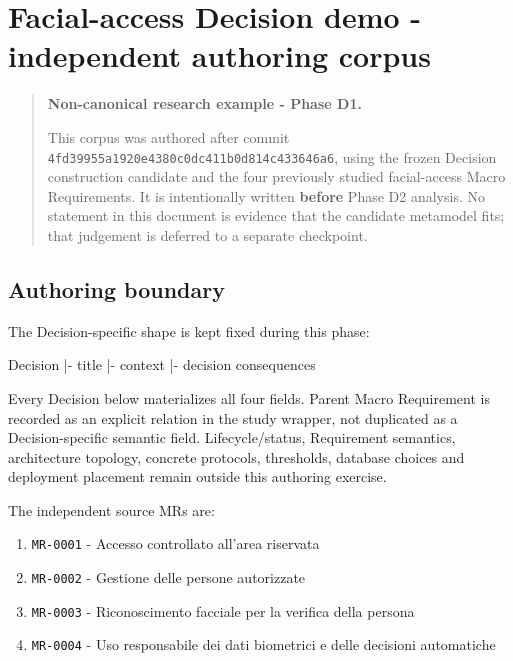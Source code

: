 \documentclass[
  10pt,
]{article}
\author{}
\date{}
\newenvironment{Shaded}{}{}
\newcommand{\NormalTok}[1]{#1}
\providecommand{\tightlist}{%
  \setlength{\itemsep}{0pt}\setlength{\parskip}{0pt}}
\begin{document}
\section{Facial-access Decision demo - independent authoring
corpus}\label{facial-access-decision-demo---independent-authoring-corpus}

\begin{quote}
\textbf{Non-canonical research example - Phase D1.}

This corpus was authored after commit
\texttt{4fd39955a1920e4380c0dc411b0d814c433646a6}, using the frozen
Decision construction candidate and the four previously studied
facial-access Macro Requirements. It is intentionally written
\textbf{before} Phase D2 analysis. No statement in this document is
evidence that the candidate metamodel fits; that judgement is deferred
to a separate checkpoint.
\end{quote}

\subsection{Authoring boundary}\label{authoring-boundary}

The Decision-specific shape is kept fixed during this phase:

\begin{Shaded}
\begin{Highlighting}[]
\NormalTok{Decision}
\NormalTok{|{-} title}
\NormalTok{|{-} context}
\NormalTok{|{-} decision}
\NormalTok{\textasciigrave{}{-} consequences}
\end{Highlighting}
\end{Shaded}

Every Decision below materializes all four fields. Parent Macro
Requirement is recorded as an explicit relation in the study wrapper,
not duplicated as a Decision-specific semantic field. Lifecycle/status,
Requirement semantics, architecture topology, concrete protocols,
thresholds, database choices and deployment placement remain outside
this authoring exercise.

The independent source MRs are:

\begin{enumerate}
\def\labelenumi{\arabic{enumi}.}
\tightlist
\item
  \texttt{MR-0001} - Accesso controllato all'area riservata
\item
  \texttt{MR-0002} - Gestione delle persone autorizzate
\item
  \texttt{MR-0003} - Riconoscimento facciale per la verifica della
  persona
\item
  \texttt{MR-0004} - Uso responsabile dei dati biometrici e delle
  decisioni automatiche
\end{enumerate}
\end{document}
